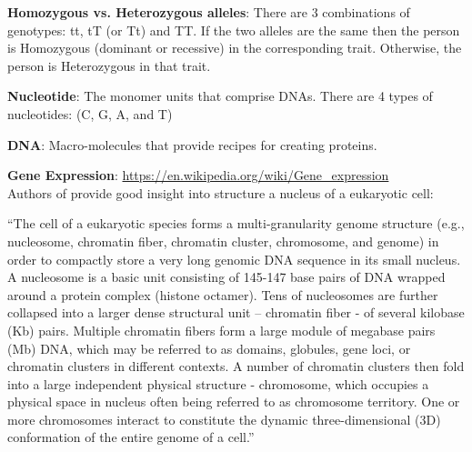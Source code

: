\documentclass{article}
\begin{document}
\textbf{Homozygous vs. Heterozygous alleles}:
There are 3 combinations of genotypes:
tt, tT (or Tt) and TT. 
If the two alleles are the same
then the person is Homozygous (dominant or recessive)
in the corresponding
trait. Otherwise, the person is Heterozygous in that trait.

\textbf{Nucleotide}:  The monomer units that comprise DNAs. There
 are 4 types of nucleotides: (C, G, A, and T)

\textbf{DNA}: Macro-molecules that provide recipes for creating 
proteins.

\textbf{Gene Expression}:
\url{https://en.wikipedia.org/wiki/Gene_expression} \\
Authors of \cite{wang2013properties} provide good insight into structure a nucleus
of a eukaryotic cell: \\
\begin{displayquote}
``The cell of a eukaryotic species forms a multi-granularity genome structure
(e.g., nucleosome, chromatin fiber, chromatin cluster, chromosome,
and genome) in order to compactly store a very long genomic 
DNA sequence in its small nucleus. A nucleosome is a basic unit 
consisting of 145-147 base pairs of DNA wrapped around a
protein complex (histone octamer). Tens of nucleosomes are
further collapsed into a larger dense structural unit
– chromatin fiber - of several kilobase (Kb) pairs.
Multiple chromatin fibers form a large module of megabase pairs 
(Mb) DNA, which may be referred to as domains, globules, gene
loci, or chromatin clusters in different contexts.
A number of chromatin clusters then fold into a large
independent physical structure - chromosome,
which occupies a physical space in nucleus often
being referred to as chromosome territory.
One or more chromosomes interact to constitute the dynamic
three-dimensional (3D) conformation of the entire genome of a cell.''
\end{displayquote}
\end{document}
